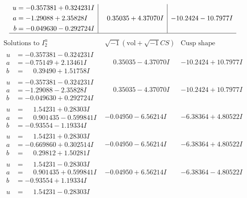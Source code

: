 \documentclass[1p]{elsarticle_modified}
\theoremstyle{definition}
\newcommand{\I}{\sqrt{-1}}
\begin{document}
$$\begin{array}{c|c|c}
\begin{aligned}
u &= -0.357381 + 0.324231 I \\
a &= -1.29088 + 2.35828 I \\
b &= -0.049630 - 0.292724 I\end{aligned}
 & \phantom{-}0.35035 + 4.37070 I & -10.2424 - 10.7977 I\\
 \hline 
 \end{array}$$\newpage$$\begin{array}{c|c|c}  
\text{Solutions to }I^u_{2}& \I (\text{vol} + \sqrt{-1}CS) & \text{Cusp shape}\\
 \hline 
\begin{aligned}
u &= -0.357381 - 0.324231 I \\
a &= -0.75149 + 2.13461 I \\
b &= \phantom{-}0.39490 + 1.51758 I\end{aligned}
 & \phantom{-}0.35035 - 4.37070 I & -10.2424 + 10.7977 I \\ \hline\begin{aligned}
u &= -0.357381 - 0.324231 I \\
a &= -1.29088 - 2.35828 I \\
b &= -0.049630 + 0.292724 I\end{aligned}
 & \phantom{-}0.35035 - 4.37070 I & -10.2424 + 10.7977 I \\ \hline\begin{aligned}
u &= \phantom{-}1.54231 + 0.28303 I \\
a &= \phantom{-}0.901435 - 0.599841 I \\
b &= -0.93554 - 1.19334 I\end{aligned}
 & -0.04950 - 6.56214 I & -6.38364 + 4.80522 I \\ \hline\begin{aligned}
u &= \phantom{-}1.54231 + 0.28303 I \\
a &= -0.669860 + 0.302514 I \\
b &= \phantom{-}0.29812 + 1.50281 I\end{aligned}
 & -0.04950 - 6.56214 I & -6.38364 + 4.80522 I \\ \hline\begin{aligned}
u &= \phantom{-}1.54231 - 0.28303 I \\
a &= \phantom{-}0.901435 + 0.599841 I \\
b &= -0.93554 + 1.19334 I\end{aligned}
 & -0.04950 + 6.56214 I & -6.38364 - 4.80522 I \\ \hline\begin{aligned}
u &= \phantom{-}1.54231 - 0.28303 I \\

\end{aligned}
\end{array}$$
\end{document}
